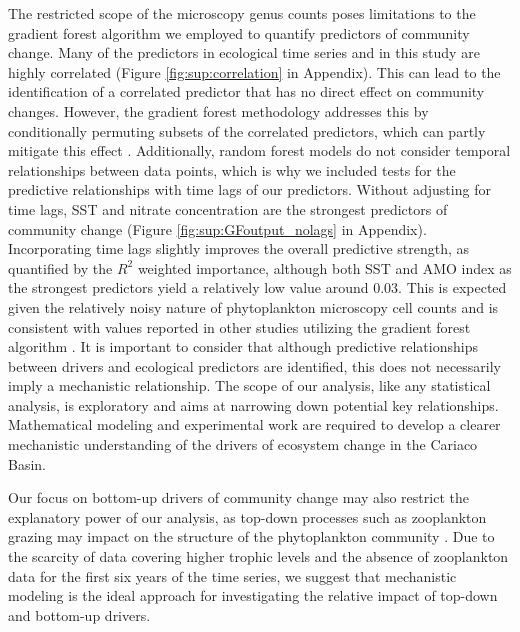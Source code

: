 \documentclass[draft]{agujournal2019}
\begin{document}
The restricted scope of the microscopy genus counts poses limitations to the gradient forest algorithm we employed to quantify predictors of community change.
Many of the predictors in ecological time series and in this study are highly correlated (Figure \ref{fig:sup:correlation} in Appendix). This can lead to the identification of a correlated predictor that has no direct effect on community changes. However, the gradient forest methodology addresses this by conditionally permuting subsets of the correlated predictors, which can partly mitigate this effect \cite{ellis_gradient_2012}. Additionally, random forest models do not consider temporal relationships between data points, which is why we included tests for the predictive relationships with time lags of our predictors. Without adjusting for time lags, SST and nitrate concentration are the strongest predictors of community change (Figure \ref{fig:sup:GFoutput_nolags} in Appendix). Incorporating time lags slightly improves the overall predictive strength, as quantified by the $R^2$ weighted importance, although both SST and AMO index as the strongest predictors yield a relatively low value around \qty{0.03}{}. This is expected given the relatively noisy nature of phytoplankton microscopy cell counts and is consistent with values reported in other studies utilizing the gradient forest algorithm \cite{pitcher_example_2012, roland_pitcher_exploring_2012, roubeix_identification_2016, samhouri_defining_2017, fraker_temporal_2022}. It is important to consider that although predictive relationships between drivers and ecological predictors are identified, this does not necessarily imply a mechanistic relationship. The scope of our analysis, like any statistical analysis, is exploratory and aims at narrowing down potential key relationships. Mathematical modeling and experimental work are required to develop a clearer mechanistic understanding of the drivers of ecosystem change in the Cariaco Basin.
 
Our focus on bottom-up drivers of community change may also restrict the explanatory power of our analysis, as top-down processes such as zooplankton grazing may impact on the structure of the phytoplankton community \cite{banas_adding_2011, acevedo-trejos_mechanisms_2015}. Due to the scarcity of data covering higher trophic levels and the absence of zooplankton data for the first six years of the time series, we suggest that mechanistic modeling is the ideal approach for investigating the relative impact of top-down and bottom-up drivers.
\end{document}
